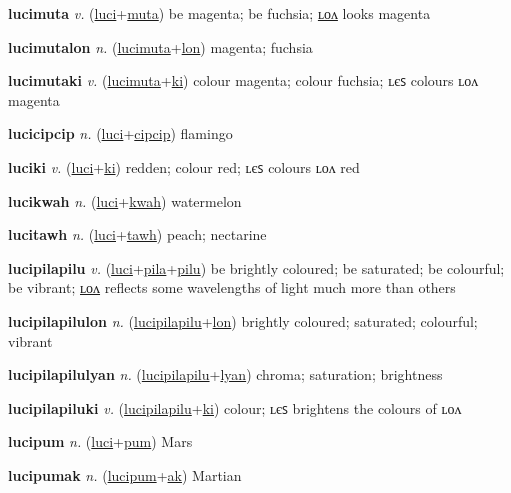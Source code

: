 \textbf{\hypertarget{lucimuta}{lucimuta}} \textit{v.} (\hyperlink{luci}{luci}+\allowbreak \hyperlink{muta}{muta})
be magenta; be fuchsia; \hyperlink{lucimutalon}{ʟᴏᴧ} looks magenta

\textbf{\hypertarget{lucimutalon}{lucimutalon}} \textit{n.} (\hyperlink{lucimuta}{lucimuta}+\allowbreak \hyperlink{lon}{lon})
magenta; fuchsia

\textbf{\hypertarget{lucimutaki}{lucimutaki}} \textit{v.} (\hyperlink{lucimuta}{lucimuta}+\allowbreak \hyperlink{ki}{ki})
colour magenta; colour fuchsia; ʟєꜱ colours ʟᴏᴧ magenta

\textbf{\hypertarget{lucicipcip}{lucicipcip}} \textit{n.} (\hyperlink{luci}{luci}+\allowbreak \hyperlink{cipcip}{cipcip})
flamingo

\textbf{\hypertarget{luciki}{luciki}} \textit{v.} (\hyperlink{luci}{luci}+\allowbreak \hyperlink{ki}{ki})
redden; colour red; ʟєꜱ colours ʟᴏᴧ red

\textbf{\hypertarget{lucikwah}{lucikwah}} \textit{n.} (\hyperlink{luci}{luci}+\allowbreak \hyperlink{kwah}{kwah})
watermelon

\textbf{\hypertarget{lucitawh}{lucitawh}} \textit{n.} (\hyperlink{luci}{luci}+\allowbreak \hyperlink{tawh}{tawh})
peach; nectarine

\textbf{\hypertarget{lucipilapilu}{lucipilapilu}} \textit{v.} (\hyperlink{luci}{luci}+\allowbreak \hyperlink{pila}{pila}+\allowbreak \hyperlink{pilu}{pilu})
be brightly coloured; be saturated; be colourful; be vibrant; \hyperlink{lucipilapilulon}{ʟᴏᴧ} reflects some wavelengths of light much more than others

\textbf{\hypertarget{lucipilapilulon}{lucipilapilulon}} \textit{n.} (\hyperlink{lucipilapilu}{lucipilapilu}+\allowbreak \hyperlink{lon}{lon})
brightly coloured; saturated; colourful; vibrant

\textbf{\hypertarget{lucipilapilulyan}{lucipilapilulyan}} \textit{n.} (\hyperlink{lucipilapilu}{lucipilapilu}+\allowbreak \hyperlink{lyan}{lyan})
chroma; saturation; brightness

\textbf{\hypertarget{lucipilapiluki}{lucipilapiluki}} \textit{v.} (\hyperlink{lucipilapilu}{lucipilapilu}+\allowbreak \hyperlink{ki}{ki})
colour; ʟєꜱ brightens the colours of ʟᴏᴧ

\textbf{\hypertarget{lucipum}{lucipum}} \textit{n.} (\hyperlink{luci}{luci}+\allowbreak \hyperlink{pum}{pum})
Mars

\textbf{\hypertarget{lucipumak}{lucipumak}} \textit{n.} (\hyperlink{lucipum}{lucipum}+\allowbreak \hyperlink{ak}{ak})
Martian

